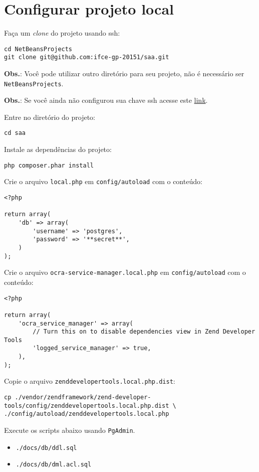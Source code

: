 \section{Configurar projeto local}

Faça um \emph{clone} do projeto usando ssh:

\begin{verbatim}
cd NetBeansProjects
git clone git@github.com:ifce-gp-20151/saa.git
\end{verbatim}
\textbf{Obs.}: Você pode utilizar outro diretório para seu projeto, não
é necessário ser \texttt{NetBeansProjects}.

\textbf{Obs.}: Se você ainda não configurou sua chave ssh acesse este
\href{https://help.github.com/articles/generating-ssh-keys/}{link}.

Entre no diretório do projeto:

\begin{verbatim}
cd saa
\end{verbatim}
Instale as dependências do projeto:

\begin{verbatim}
php composer.phar install
\end{verbatim}
Crie o arquivo \texttt{local.php} em \texttt{config/autoload} com o
conteúdo:

\begin{verbatim}
<?php

return array(
    'db' => array(
        'username' => 'postgres',
        'password' => '**secret**',
    )
);
\end{verbatim}
Crie o arquivo \texttt{ocra-service-manager.local.php} em
\texttt{config/autoload} com o conteúdo:

\begin{verbatim}
<?php

return array(
    'ocra_service_manager' => array(
        // Turn this on to disable dependencies view in Zend Developer Tools
        'logged_service_manager' => true,
    ),
);
\end{verbatim}
Copie o arquivo \texttt{zenddevelopertools.local.php.dist}:

\begin{verbatim}
cp ./vendor/zendframework/zend-developer-tools/config/zenddevelopertools.local.php.dist \
./config/autoload/zenddevelopertools.local.php
\end{verbatim}
Execute os scripts abaixo usando \texttt{PgAdmin}.

\begin{itemize}
\item
  \texttt{./docs/db/ddl.sql}
\item
  \texttt{./docs/db/dml.acl.sql}
\end{itemize}
